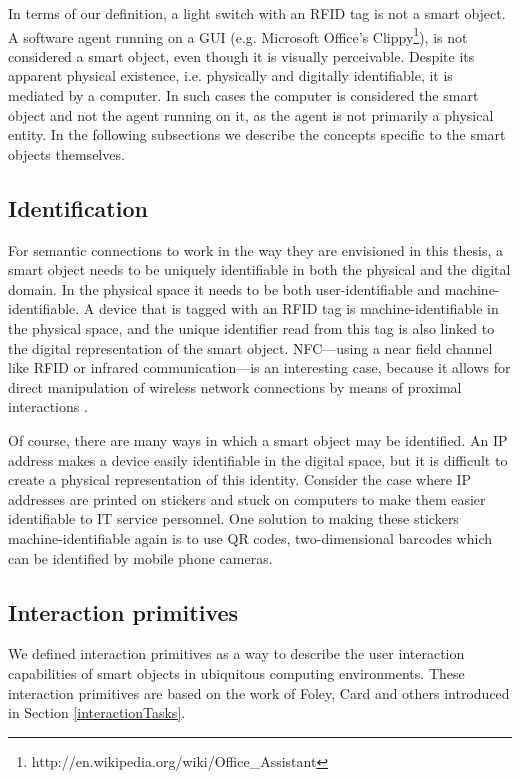 In terms of our definition, a light switch with an \ac{RFID} tag is not a smart object. A software agent running on a \ac{GUI} (e.g. Microsoft Office's Clippy\footnote{http://en.wikipedia.org/wiki/Office\_Assistant}), is not considered a smart object, even though it is visually perceivable. Despite its apparent physical existence, i.e. physically and digitally identifiable, it is mediated by a computer. In such cases the computer is considered the smart object and not the agent running on it, as the agent is not primarily a physical entity. In the following subsections we describe the concepts specific to the smart objects themselves.

\subsection{Identification}
\label{Identification}
For semantic connections to work in the way they are envisioned in this thesis, a smart object needs to be uniquely identifiable in both the physical and the digital domain. In the physical space it needs to be both user-identifiable and machine-identifiable. A device that is tagged with an \ac{RFID} tag is machine-identifiable in the physical space, and the unique identifier read from this tag is also linked to the digital representation of the smart object. \ac{NFC}---using a near field channel like \ac{RFID} or infrared communication---is an interesting case, because it allows for direct manipulation of wireless network connections by means of proximal interactions \cite{Rekimoto2003}.

Of course, there are many ways in which a smart object may be identified. An IP address makes a device easily identifiable in the digital space, but it is difficult to create a physical representation of this identity. Consider the case where IP addresses are printed on stickers and stuck on computers to make them easier identifiable to IT service personnel. One solution to making these stickers machine-identifiable again is to use \ac{QR} codes, two-dimensional barcodes which can be identified by mobile phone cameras.

\subsection{Interaction primitives}
\label{InteractionPrimitives}

We defined interaction primitives as a way to describe the user interaction capabilities of smart objects in ubiquitous computing environments.  These interaction primitives are based on the work of Foley, Card and others introduced in Section \ref{interactionTasks}.

